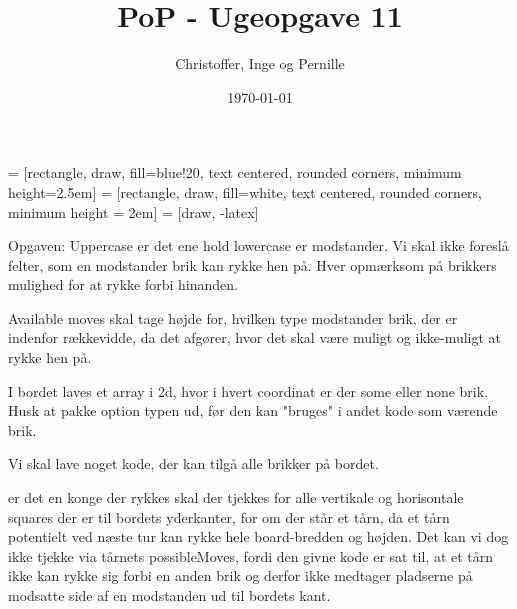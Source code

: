 \documentclass[a4paper]{report}
\title{PoP - Ugeopgave 11}
\author{Christoffer, Inge og Pernille}
\date{\today}
\begin{document}
\maketitle
{} = [rectangle, draw, fill=blue!20, text centered,
    rounded corners, minimum height=2.5em]
 = [rectangle, draw, fill=white, text centered,
    rounded corners, minimum height = 2em]
 = [draw, -latex]




Opgaven:
Uppercase er det ene hold lowercase er modstander.
Vi skal ikke foreslå felter, som en modstander brik kan rykke hen på. 
Hver opmærksom på brikkers mulighed for at rykke forbi hinanden.

Available moves skal tage højde for, hvilken type modstander brik, der er indenfor rækkevidde, da det afgører, hvor det skal være muligt og ikke-muligt at rykke hen på. 

I bordet laves et array i 2d, hvor i hvert coordinat er der some eller none brik.
Husk at pakke option typen ud, før den kan "bruges" i andet kode som værende brik.

Vi skal lave noget kode, der kan tilgå alle brikker på bordet.

er det en konge der rykkes skal der tjekkes for alle vertikale og horisontale squares der er til bordets yderkanter, for om der står et tårn, da et tårn potentielt ved næste tur kan rykke hele board-bredden og højden. Det kan vi dog ikke tjekke via tårnets possibleMoves, fordi den givne kode er sat til, at et tårn ikke kan rykke sig forbi en anden brik og derfor ikke medtager pladserne på modsatte side af en modstanden ud til bordets kant.
\end{document}

